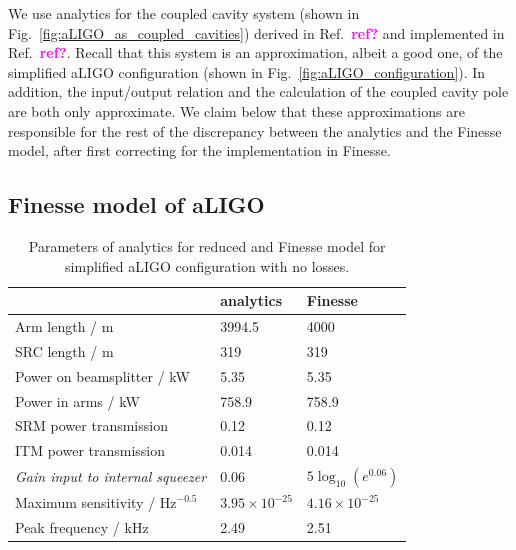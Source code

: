 \documentclass[aps,pra,superscriptaddress,reprint,nofootinbib]{revtex4-1}
\newcommand{\jam}[1]{\textcolor{magenta}{\textbf{#1}}}
\begin{document}
We use analytics for the coupled cavity system (shown in Fig.~\ref{fig:aLIGO_as_coupled_cavities}) derived in Ref.~\jam{ref?} and implemented in Ref.~\jam{ref?}. Recall that this system is an approximation, albeit a good one, of the simplified aLIGO configuration (shown in Fig.~\ref{fig:aLIGO_configuration}). In addition, the input/output relation and the calculation of the coupled cavity pole are both only approximate. We claim below that these approximations are responsible for the rest of the discrepancy between the analytics and the Finesse model, after first correcting for the implementation in Finesse.


\subsection{Finesse model of aLIGO}

\begin{table}
	\centering
	\begin{tabular}{l|ll}
	 & analytics & Finesse \\ \hline
	Arm length / m & 3994.5 & 4000 \\
	SRC length / m & 319 & 319 \\
	Power on beamsplitter / kW & 5.35 & 5.35 \\
	Power in arms / kW & 758.9 & 758.9 \\
	SRM power transmission & 0.12 & 0.12 \\
	ITM power transmission & 0.014 & 0.014 \\
	\textit{Gain input to internal squeezer} & 0.06 & $5 \log_{10}(e^{0.06})$ \\
	Maximum sensitivity / $\mathrm{Hz}^{-0.5}$ & $3.95 \times 10^{-25}$ & $4.16 \times 10^{-25}$ \\
	Peak frequency / kHz & 2.49 & 2.51
	\end{tabular}%
	\caption{Parameters of analytics for reduced and Finesse model for simplified aLIGO configuration with no losses.}
	\label{tab:aLIGO_parameters}
\end{table}
\end{document}
